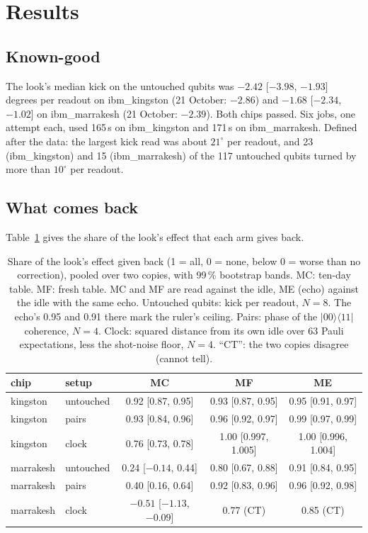 \documentclass[reprint,amsmath,amssymb,aps,superscriptaddress,nofootinbib]{revtex4-2}
\begin{document}
\section{Results}

\subsection{Known-good}
The look's median kick on the untouched qubits was $-2.42$ [$-3.98$, $-1.93$] degrees per readout on ibm\_kingston (21 October: $-2.86$) and $-1.68$ [$-2.34$, $-1.02$] on ibm\_marrakesh (21 October: $-2.39$). Both chips passed. Six jobs, one attempt each, used 165\,s on ibm\_kingston and 171\,s on ibm\_marrakesh. Defined after the data: the largest kick read was about $21^\circ$ per readout, and 23 (ibm\_kingston) and 15 (ibm\_marrakesh) of the 117 untouched qubits turned by more than $10^\circ$ per readout.

\subsection{What comes back}
Table~\ref{tab:back} gives the share of the look's effect that each arm gives back.

\begin{table}[t]
\caption{\label{tab:back}Share of the look's effect given back (1 = all, 0 = none, below 0 = worse than no correction), pooled over two copies, with 99\,\% bootstrap bands. MC: ten-day table. MF: fresh table. MC and MF are read against the idle, ME (echo) against the idle with the same echo. Untouched qubits: kick per readout, $N=8$. The echo's 0.95 and 0.91 there mark the ruler's ceiling. Pairs: phase of the $|00\rangle\langle11|$ coherence, $N=4$. Clock: squared distance from its own idle over 63 Pauli expectations, less the shot-noise floor, $N=4$. ``CT'': the two copies disagree (cannot tell).}
\begin{ruledtabular}
\begin{tabular}{llccc}
chip & setup & MC & MF & ME \\
\hline
kingston & untouched & 0.92 [0.87, 0.95] & 0.93 [0.87, 0.95] & 0.95 [0.91, 0.97] \\
kingston & pairs & 0.93 [0.84, 0.96] & 0.96 [0.92, 0.97] & 0.99 [0.97, 0.99] \\
kingston & clock & 0.76 [0.73, 0.78] & 1.00 [0.997, 1.005] & 1.00 [0.996, 1.004] \\
marrakesh & untouched & 0.24 [$-0.14$, 0.44] & 0.80 [0.67, 0.88] & 0.91 [0.84, 0.95] \\
marrakesh & pairs & 0.40 [0.16, 0.64] & 0.92 [0.83, 0.96] & 0.96 [0.92, 0.98] \\
marrakesh & clock & $-0.51$ [$-1.13$, $-0.09$] & 0.77 (CT) & 0.85 (CT) \\
\end{tabular}
\end{ruledtabular}
\end{table}
\end{document}
